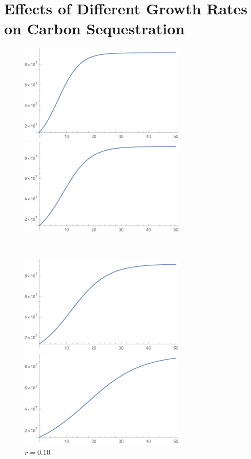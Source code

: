 \documentclass[12pt]{article}
\begin{document}
\section{Effects of Different Growth Rates on Carbon Sequestration}
\begin{figure}[hp!]
    \centering
    \begin{minipage}{8cm}
        \centering
        \includegraphics[width=8cm]{C025.pdf}
        \caption{$r=0.25$}
    \end{minipage}
    \qquad
    \begin{minipage}{8cm}
        \centering
        \includegraphics[width=8cm]{C020.pdf}
        \caption{$r=0.20$}
    \end{minipage}\\
    \begin{minipage}{8cm}
        \centering
        \includegraphics[width=8cm]{C015.pdf}
        \caption{$r=0.15$}
    \end{minipage}
    \qquad
    \begin{minipage}{8cm}
        \centering
        \includegraphics[width=8cm]{C010.pdf}
        \caption{$r=0.10$}
    \end{minipage}
\end{figure}
\end{document}
